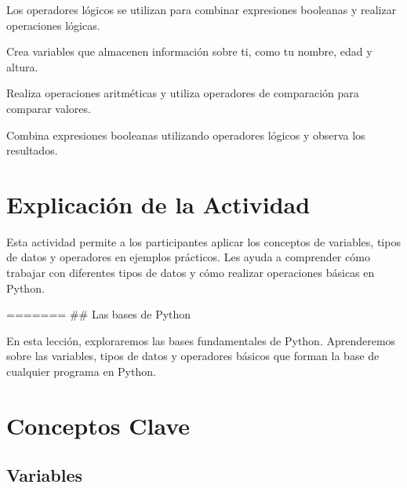 \documentclass[
  a4paper,
  DIV=11,
  numbers=noendperiod,
  onepage,
  openany]{scrreprt}
\begin{document}
Los operadores lógicos se utilizan para combinar expresiones booleanas y
realizar operaciones lógicas.

\begin{tcolorbox}[enhanced jigsaw, colbacktitle=quarto-callout-important-color!10!white, toprule=.15mm, leftrule=.75mm, titlerule=0mm, opacityback=0, rightrule=.15mm, opacitybacktitle=0.6, breakable, left=2mm, coltitle=black, title=\textcolor{quarto-callout-important-color}{\faExclamation}\hspace{0.5em}{Actividad Práctica:}, toptitle=1mm, bottomtitle=1mm, arc=.35mm, bottomrule=.15mm, colback=white, colframe=quarto-callout-important-color-frame]

Crea variables que almacenen información sobre ti, como tu nombre, edad
y altura.

Realiza operaciones aritméticas y utiliza operadores de comparación para
comparar valores.

Combina expresiones booleanas utilizando operadores lógicos y observa
los resultados.

\end{tcolorbox}

\hypertarget{explicaciuxf3n-de-la-actividad-4}{%
\section{Explicación de la
Actividad}\label{explicaciuxf3n-de-la-actividad-4}}

Esta actividad permite a los participantes aplicar los conceptos de
variables, tipos de datos y operadores en ejemplos prácticos. Les ayuda
a comprender cómo trabajar con diferentes tipos de datos y cómo realizar
operaciones básicas en Python.

======= \#\# Las bases de Python

En esta lección, exploraremos las bases fundamentales de Python.
Aprenderemos sobre las variables, tipos de datos y operadores básicos
que forman la base de cualquier programa en Python.

\hypertarget{conceptos-clave-5}{%
\section{Conceptos Clave}\label{conceptos-clave-5}}

\hypertarget{variables-1}{%
\subsection{Variables}\label{variables-1}}
\end{document}
